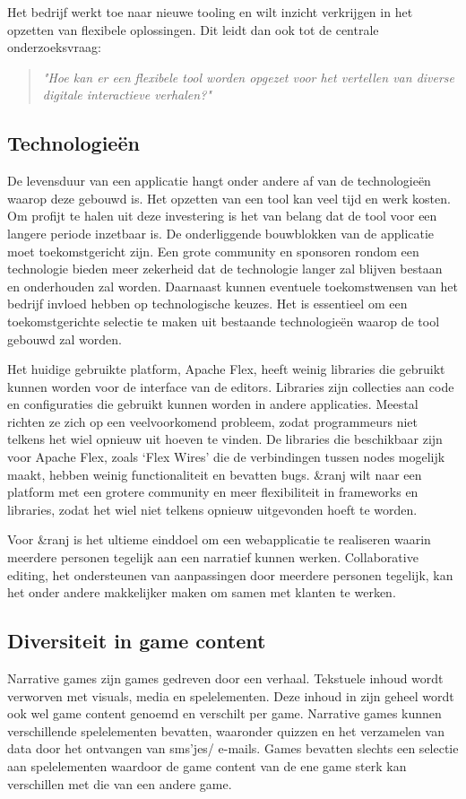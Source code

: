 Het bedrijf werkt toe naar nieuwe tooling en wilt inzicht verkrijgen in het opzetten van flexibele oplossingen. Dit leidt dan ook tot de centrale onderzoeksvraag: 

\begin{quote} 
    \centering
    \large
    \textit{
        "Hoe kan er een flexibele tool worden opgezet voor het vertellen van diverse digitale interactieve verhalen?"
    }
\end{quote}

\subsection{Technologieën}
De levensduur van een applicatie hangt onder andere af van de technologieën waarop deze gebouwd is. Het opzetten van een tool kan veel tijd en werk kosten. Om profijt te halen uit deze investering is het van belang dat de tool voor een langere periode inzetbaar is. De onderliggende bouwblokken van de applicatie moet toekomstgericht zijn. Een grote community en sponsoren rondom een technologie bieden meer zekerheid dat de technologie langer zal blijven bestaan en onderhouden zal worden. Daarnaast kunnen eventuele toekomstwensen van het bedrijf invloed hebben op technologische keuzes. Het is essentieel om een toekomstgerichte selectie te maken uit bestaande technologieën waarop de tool gebouwd zal worden.

Het huidige gebruikte platform, Apache Flex, heeft weinig libraries die gebruikt kunnen worden voor de interface van de editors. Libraries zijn collecties aan code en configuraties die gebruikt kunnen worden in andere applicaties. Meestal richten ze zich op een veelvoorkomend probleem, zodat programmeurs niet telkens het wiel opnieuw uit hoeven te vinden. De libraries die beschikbaar zijn voor Apache Flex, zoals ‘Flex Wires’ die de verbindingen tussen nodes mogelijk maakt, hebben weinig functionaliteit en bevatten bugs. \&ranj wilt naar een platform met een grotere community en meer flexibiliteit in frameworks en libraries, zodat het wiel niet telkens opnieuw uitgevonden hoeft te worden.

Voor \&ranj is het ultieme einddoel om een webapplicatie te realiseren waarin meerdere personen tegelijk aan een narratief kunnen werken. Collaborative editing, het ondersteunen van aanpassingen door meerdere personen tegelijk, kan het onder andere makkelijker maken om samen met klanten te werken.

\subsection{Diversiteit in game content}
Narrative games zijn games gedreven door een verhaal. Tekstuele inhoud wordt verworven met visuals, media en spelelementen. Deze inhoud in zijn geheel wordt ook wel game content genoemd en verschilt per game. Narrative games kunnen verschillende spelelementen bevatten, waaronder quizzen en het verzamelen van data door het ontvangen van sms’jes/ e-mails. Games bevatten slechts een selectie aan spelelementen waardoor de game content van de ene game sterk kan verschillen met die van een andere game.

